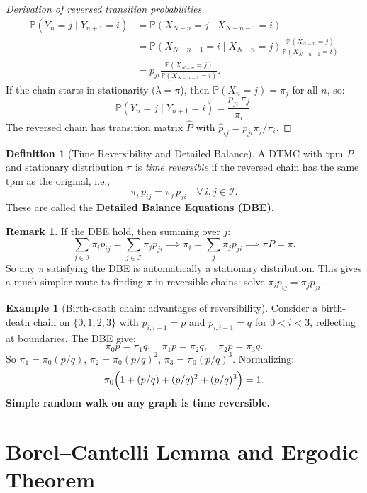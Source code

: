 \documentclass[12pt, a4paper]{article}
\theoremstyle{definition}
\newtheorem{definition}{Definition}[section]
\newtheorem{example}{Example}[section]
\newtheorem{remark}{Remark}[section]
\theoremstyle{plain}
\newcommand{\PP}{\mathbb{P}}
\begin{document}
\begin{proof}[Derivation of reversed transition probabilities]
\begin{align*}
  \PP(Y_n = j\mid Y_{n+1} = i) &= \PP(X_{N-n}=j\mid X_{N-n-1}=i)\\
    &= \PP(X_{N-n-1}=i\mid X_{N-n}=j)\frac{\PP(X_{N-n}=j)}{\PP(X_{N-n-1}=i)}\\
    &= p_{ji}\frac{\PP(X_{N-n}=j)}{\PP(X_{N-n-1}=i)}.
\end{align*}
If the chain starts in stationarity ($\lambda=\pi$), then $\PP(X_n=j)=\pi_j$ for all $n$, so:
\[
  \PP(Y_n=j\mid Y_{n+1}=i) = \frac{p_{ji}\,\pi_j}{\pi_i}.
\]
The reversed chain has transition matrix $\hat{P}$ with $\hat{p}_{ij} = p_{ji}\pi_j/\pi_i$.
\end{proof}

\begin{definition}[Time Reversibility and Detailed Balance]
A DTMC with tpm $P$ and stationary distribution $\pi$ is \emph{time reversible} if the reversed chain has the same tpm as the original, i.e.,
\[
  \pi_i\,p_{ij} = \pi_j\,p_{ji} \quad \forall\,i,j\in\mathcal{I}.
\]
These are called the \textbf{Detailed Balance Equations (DBE)}.
\end{definition}

\begin{remark}
If the DBE hold, then summing over $j$:
\[
  \sum_{j\in\mathcal{I}}\pi_i p_{ij} = \sum_{j\in\mathcal{I}}\pi_j p_{ji} \implies \pi_i = \sum_{j}\pi_j p_{ji} \implies \pi P = \pi.
\]
So any $\pi$ satisfying the DBE is automatically a stationary distribution. This gives a much simpler route to finding $\pi$ in reversible chains: solve $\pi_i p_{ij}=\pi_j p_{ji}$.
\end{remark}

\begin{example}[Birth-death chain: advantages of reversibility]
Consider a birth-death chain on $\{0,1,2,3\}$ with $p_{i,i+1}=p$ and $p_{i,i-1}=q$ for $0<i<3$, reflecting at boundaries. The DBE give:
\[
  \pi_0 p = \pi_1 q,\quad \pi_1 p = \pi_2 q,\quad \pi_2 p = \pi_3 q.
\]
So $\pi_1 = \pi_0(p/q)$, $\pi_2 = \pi_0(p/q)^2$, $\pi_3 = \pi_0(p/q)^3$. Normalizing:
\[
  \pi_0\Bigl(1+(p/q)+(p/q)^2+(p/q)^3\Bigr) = 1.
\]
\textbf{Simple random walk on any graph is time reversible.}
\end{example}

\section{Borel--Cantelli Lemma and Ergodic Theorem}
\end{document}
